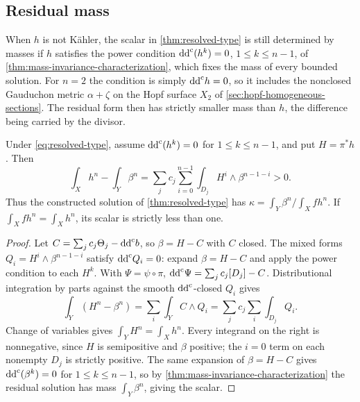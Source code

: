 \subsection{Residual mass}\label{sec:mass-deficit}

When $h$ is not K\"ahler, the scalar in \cref{thm:resolved-type} is still determined by masses if $h$ satisfies the power condition $\mathrm{dd}^{\mathrm{c}}(h^k)=0$, $1\leq k\leq n-1$, of \cref{thm:mass-invariance-characterization}, which fixes the mass of every bounded solution. For $n=2$ the condition is simply $\mathrm{dd}^{\mathrm{c}} h=0$, so it includes the nonclosed Gauduchon metric $\alpha+\zeta$ on the Hopf surface $X_2$ of \cref{sec:hopf-homogeneous-sections}. The residual form then has strictly smaller mass than $h$, the difference being carried by the divisor.

\begin{proposition}\label{prop:mass-deficit}
Under \eqref{eq:resolved-type}, assume $\mathrm{dd}^{\mathrm{c}}(h^k)=0$ for $1\leq k\leq n-1$, and put $H=\pi^*h$. Then
\begin{equation}\label{eq:mass-deficit}
 \int_Xh^n-\int_Y\beta^n
 =\sum_jc_j\sum_{i=0}^{n-1}
   \int_{D_j}H^i\wedge\beta^{n-1-i}>0.
\end{equation}
Thus the constructed solution of \cref{thm:resolved-type} has $\kappa=\int_Y\beta^n/\int_Xfh^n$. If $\int_Xfh^n=\int_Xh^n$, its scalar is strictly less than one.
\end{proposition}

\begin{proof}
Let $C=\sum_jc_j\Theta_j-\mathrm{dd}^{\mathrm{c}} b$, so $\beta=H-C$ with $C$ closed. The mixed forms $Q_i=H^i\wedge\beta^{n-1-i}$ satisfy $\mathrm{dd}^{\mathrm{c}} Q_i=0$: expand $\beta=H-C$ and apply the power condition to each $H^k$. With $\Psi=\psi\circ\pi$, $\mathrm{dd}^{\mathrm{c}}\Psi=\sum_jc_j[D_j]-C$. Distributional integration by parts against the smooth $\mathrm{dd}^{\mathrm{c}}$-closed $Q_i$ gives
\[
 \int_Y(H^n-\beta^n)=\sum_i\int_Y C\wedge Q_i
   =\sum_jc_j\sum_i\int_{D_j}Q_i.
\]
Change of variables gives $\int_YH^n=\int_Xh^n$. Every integrand on the right is nonnegative, since $H$ is semipositive and $\beta$ positive; the $i=0$ term on each nonempty $D_j$ is strictly positive. The same expansion of $\beta=H-C$ gives $\mathrm{dd}^{\mathrm{c}}(\beta^k)=0$ for $1\leq k\leq n-1$, so by \cref{thm:mass-invariance-characterization} the residual solution has mass $\int_Y\beta^n$, giving the scalar.
\end{proof}
